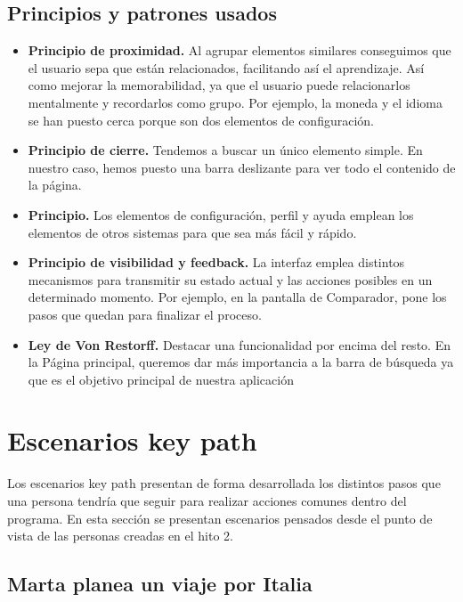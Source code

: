\subsection{Principios y patrones usados}

\begin{itemize}

    \item \textbf{Principio de proximidad.} Al agrupar elementos similares conseguimos que el usuario sepa que están relacionados, facilitando así el aprendizaje. Así como mejorar la memorabilidad, ya que el usuario puede relacionarlos mentalmente y recordarlos como grupo.
    Por ejemplo, la moneda y el idioma se han puesto cerca porque son dos elementos de configuración.    
    \item \textbf{Principio de cierre.} Tendemos a buscar un único elemento simple.
    En nuestro caso, hemos puesto una barra deslizante para ver todo el contenido de la página.
    \item \textbf{Principio.} Los elementos de configuración, perfil y ayuda emplean los elementos de otros sistemas para que sea más fácil y rápido.
    \item \textbf{Principio de visibilidad y feedback.} La interfaz emplea distintos mecanismos para transmitir su estado actual y las acciones posibles en un determinado momento.
    Por ejemplo, en la pantalla de Comparador, pone los pasos que quedan para finalizar el proceso.
    \item \textbf{Ley de Von Restorff.} Destacar una funcionalidad por encima del resto.
    En la Página principal, queremos dar más importancia a la barra de búsqueda ya que es el objetivo principal de nuestra aplicación

\end{itemize}


\section{Escenarios key path}
Los escenarios key path presentan de forma desarrollada los distintos pasos que una persona tendría que seguir para realizar acciones comunes dentro del programa. En esta sección se presentan escenarios pensados desde el punto de vista de las personas creadas en el hito 2.

\subsection{Marta planea un viaje por Italia}


